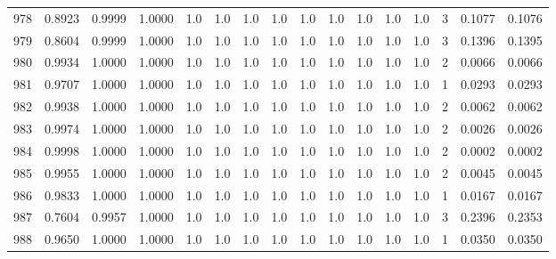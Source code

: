\begin{tabular}{lrrrrrrrrrrrrrrr}
978 &      0.8923 &  0.9999 &  1.0000 &     1.0 &     1.0 &     1.0 &     1.0 &     1.0 &     1.0 &     1.0 &      1.0 &        1.0 &      3 &                    0.1077 &                     0.1076 \\
979 &      0.8604 &  0.9999 &  1.0000 &     1.0 &     1.0 &     1.0 &     1.0 &     1.0 &     1.0 &     1.0 &      1.0 &        1.0 &      3 &                    0.1396 &                     0.1395 \\
980 &      0.9934 &  1.0000 &  1.0000 &     1.0 &     1.0 &     1.0 &     1.0 &     1.0 &     1.0 &     1.0 &      1.0 &        1.0 &      2 &                    0.0066 &                     0.0066 \\
981 &      0.9707 &  1.0000 &  1.0000 &     1.0 &     1.0 &     1.0 &     1.0 &     1.0 &     1.0 &     1.0 &      1.0 &        1.0 &      1 &                    0.0293 &                     0.0293 \\
982 &      0.9938 &  1.0000 &  1.0000 &     1.0 &     1.0 &     1.0 &     1.0 &     1.0 &     1.0 &     1.0 &      1.0 &        1.0 &      2 &                    0.0062 &                     0.0062 \\
983 &      0.9974 &  1.0000 &  1.0000 &     1.0 &     1.0 &     1.0 &     1.0 &     1.0 &     1.0 &     1.0 &      1.0 &        1.0 &      2 &                    0.0026 &                     0.0026 \\
984 &      0.9998 &  1.0000 &  1.0000 &     1.0 &     1.0 &     1.0 &     1.0 &     1.0 &     1.0 &     1.0 &      1.0 &        1.0 &      2 &                    0.0002 &                     0.0002 \\
985 &      0.9955 &  1.0000 &  1.0000 &     1.0 &     1.0 &     1.0 &     1.0 &     1.0 &     1.0 &     1.0 &      1.0 &        1.0 &      2 &                    0.0045 &                     0.0045 \\
986 &      0.9833 &  1.0000 &  1.0000 &     1.0 &     1.0 &     1.0 &     1.0 &     1.0 &     1.0 &     1.0 &      1.0 &        1.0 &      1 &                    0.0167 &                     0.0167 \\
987 &      0.7604 &  0.9957 &  1.0000 &     1.0 &     1.0 &     1.0 &     1.0 &     1.0 &     1.0 &     1.0 &      1.0 &        1.0 &      3 &                    0.2396 &                     0.2353 \\
988 &      0.9650 &  1.0000 &  1.0000 &     1.0 &     1.0 &     1.0 &     1.0 &     1.0 &     1.0 &     1.0 &      1.0 &        1.0 &      1 &                    0.0350 &                     0.0350 \\

\end{tabular}
